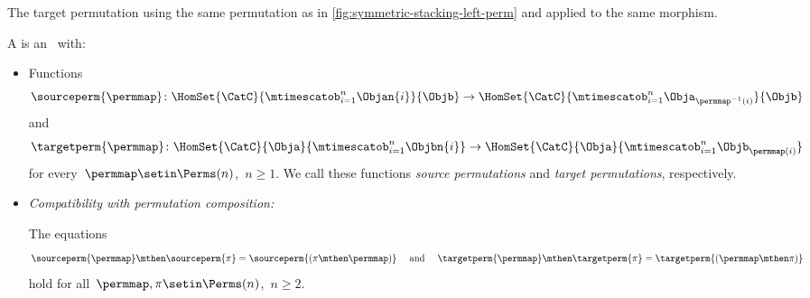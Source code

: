 \begin{marginfigure}
    \centering
    \caption{The target permutation using the same permutation as in \cref{fig:symmetric-stacking-left-perm} and applied to the same morphism.}
    \label{fig:symmetric-stacking-target-perm}
\end{marginfigure}
\begin{ctdefinition}
    \label{def:symmetric-stacking-category}
    A  is an  ~\CatC with:

    \constit

    \begin{itemize}
        \item Functions
              \begin{equation}
                  \sourceperm{\permmap} \colon \HomSet{\CatC}{\mtimescatob_{i=1}^n \Objan{i}}{\Objb} \to \HomSet{\CatC}{\mtimescatob_{i=1}^n \Obja_{\permmap^{-1}(i)}}{\Objb}
              \end{equation}
              and
              \begin{equation}
                  \targetperm{\permmap} \colon \HomSet{\CatC}{\Obja}{\mtimescatob_{i=1}^n \Objbn{i}} \to \HomSet{\CatC}{\Obja}{\mtimescatob_{i=1}^n \Objb_{\permmap(i)}}
              \end{equation}
              for every~$\permmap \setin \Perms(n)$,~$n \geq 1$.
              We call these functions \emph{source permutations} and \emph{target permutations}, respectively.
    \end{itemize}

    \condit

    \begin{itemize}

        \item \emph{Compatibility with permutation composition:}

              The equations
              \begin{equation}
                  \label{eq:perm-compatibility-with-perm-comp}
                  \sourceperm{\permmap} \mthen \sourceperm{\pi} = \sourceperm{(\pi\mthen\permmap)}
                  \quad \text{ and } \quad
                  \targetperm{\permmap} \mthen \targetperm{\pi} = \targetperm{(\permmap \mthen \pi)}
              \end{equation}
              hold for all~$\permmap, \pi \setin \Perms(n)$,~$n \geq 2$.


\end{itemize}
\end{ctdefinition}
